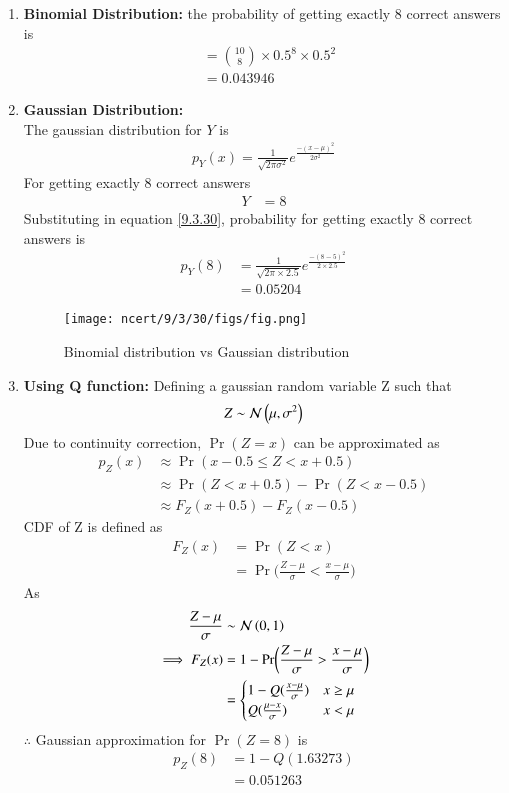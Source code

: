 \documentclass[journal,12pt,onecolumn]{IEEEtran}
\theoremstyle{remark}
\begin{document}
\begin{enumerate}
\item \textbf{Binomial Distribution:} 
the probability of getting exactly 8 correct answers is 
\begin{align}
	&= \binom{10}{8} \times 0.5^8\times 0.5^{2}\\
	&= 0.043946
\end{align}
\item \textbf{Gaussian Distribution:}\\
The gaussian distribution for $Y$ is
\begin{align}
	p_Y(x) = \frac{1}{\sqrt{2\pi\sigma^2}}e^{\frac{-(x-\mu)^2}{2\sigma^2}}\label{9.3.30}
\end{align}
For getting exactly 8 correct answers
\begin{align}
	Y &= 8
\end{align}
Substituting in equation \eqref{9.3.30}, probability for getting exactly 8 correct answers is
\begin{align}
	p_Y(8) &= \frac{1}{\sqrt{2\pi\times2.5}}e^{\frac{-(8-5)^2}{2\times2.5}}\\
	&= 0.05204
\end{align}
\begin{figure}[H]
\texttt{[image: ncert/9/3/30/figs/fig.png]}
\caption{Binomial distribution vs Gaussian distribution}
	\label{fig58:_9_3_30}
\end{figure}
\item \textbf{Using Q function:}
Defining a gaussian random variable Z such that
\begin{align}
	Z \sim \mathcal{N}\left(\mu,\sigma^2\right)
\end{align}
Due to continuity correction, $\Pr(Z=x)$ can be approximated as
\begin{align}
	p_Z(x) &\approx \Pr(x-0.5\le Z < x+0.5)\\
	&\approx \Pr(Z < x+0.5) - \Pr(Z < x-0.5)\\
	&\approx F_Z(x+0.5)-F_Z(x-0.5)
\end{align}
CDF of Z is defined as
\begin{align}
	F_Z(x) &= \Pr(Z<x)\\
	&= \Pr\biggl(\frac{Z-\mu}{\sigma}<\frac{x-\mu}{\sigma}\biggr)
\end{align}
As
\begin{align}
	\frac{Z-\mu}{\sigma} &\sim \mathcal{N}\left(0,1\right)\\
	\implies F_Z(x) 
	&= 1 - \Pr\biggl(\frac{Z-\mu}{\sigma}>\frac{x-\mu}{\sigma}\biggr)\\
	&= \begin{cases}
		1-Q(\frac{x-\mu}{\sigma}) & x\geq \mu\\
		Q(\frac{\mu-x}{\sigma}) & x < \mu
	\end{cases}
\end{align}
$\therefore$ Gaussian approximation for $\Pr(Z = 8)$ is 
\begin{align}
	p_Z(8) &= 1-Q(1.63273) \\
	&= 0.051263
\end{align}
\end{enumerate}
\end{document}
